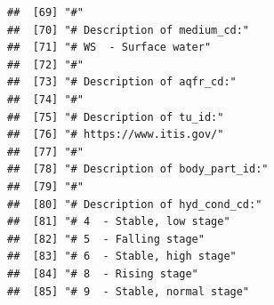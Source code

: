 \documentclass[
]{book}
\begin{document}
\begin{verbatim}
##  [69] "#"                                                                                                                                            
##  [70] "# Description of medium_cd:"                                                                                                                  
##  [71] "# WS  - Surface water"                                                                                                                        
##  [72] "#"                                                                                                                                            
##  [73] "# Description of aqfr_cd:"                                                                                                                    
##  [74] "#"                                                                                                                                            
##  [75] "# Description of tu_id:"                                                                                                                      
##  [76] "# https://www.itis.gov/"                                                                                                                      
##  [77] "#"                                                                                                                                            
##  [78] "# Description of body_part_id:"                                                                                                               
##  [79] "#"                                                                                                                                            
##  [80] "# Description of hyd_cond_cd:"                                                                                                                
##  [81] "# 4  - Stable, low stage"                                                                                                                     
##  [82] "# 5  - Falling stage"                                                                                                                         
##  [83] "# 6  - Stable, high stage"                                                                                                                    
##  [84] "# 8  - Rising stage"                                                                                                                          
##  [85] "# 9  - Stable, normal stage"                                                                                                                  

\end{verbatim}
\end{document}
